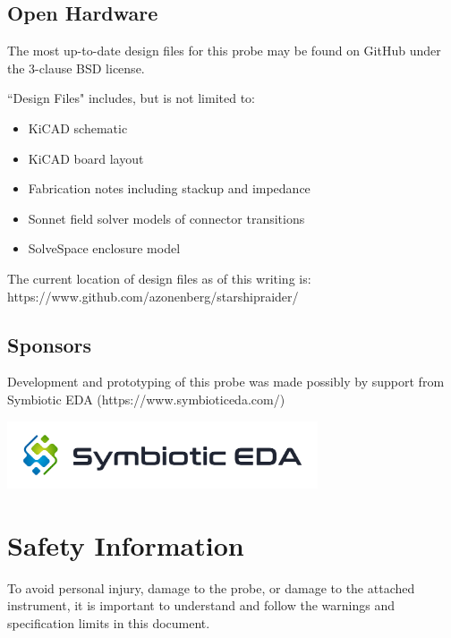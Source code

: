 \documentclass[11pt]{article}
\begin{document}
\subsection{Open Hardware}

The most up-to-date design files for this probe may be found on GitHub under the 3-clause BSD license.

``Design Files" includes, but is not limited to:
\begin{itemize}
\item KiCAD schematic
\item KiCAD board layout
\item Fabrication notes including stackup and impedance
\item Sonnet field solver models of connector transitions
\item SolveSpace enclosure model
\end{itemize}

The current location of design files as of this writing is: \\ https://www.github.com/azonenberg/starshipraider/

\subsection{Sponsors}

Development and prototyping of this probe was made possibly by support from Symbiotic EDA
(https://www.symbioticeda.com/)

\includegraphics[height=2cm]{symbiotic-logo.png}

\pagebreak
\section{Safety Information}

To avoid personal injury, damage to the probe, or damage to the attached instrument, it is important to understand and
follow the warnings and specification limits in this document.
\end{document}
